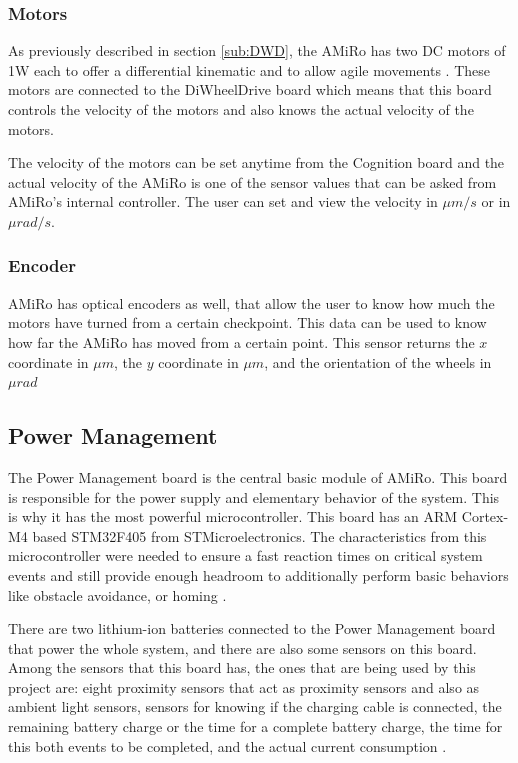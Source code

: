 \documentclass[12pt]{report}%
\begin{document}
\subsubsection{Motors}
As previously described in section \ref{sub:DWD}, the AMiRo has two DC motors of 1W each to offer a differential kinematic and to allow agile movements \cite{AMiRo_paper_modular}. These motors are connected to the DiWheelDrive board which means that this board controls the velocity of the motors and also knows the actual velocity of the motors.

The velocity of the motors can be set anytime from the Cognition board and the actual velocity of the AMiRo is one of the sensor values that can be asked from AMiRo's internal controller. The user can set and view the velocity in $\mu m/s$ or in $\mu rad/s$.

\subsubsection{Encoder}
AMiRo has optical encoders as well, that allow the user to know how much the motors have turned from a certain checkpoint. This data can be used to know how far the AMiRo has moved from a certain point. This sensor returns the $x$ coordinate in $\mu m$, the $y$ coordinate in $\mu m$, and the orientation of the wheels in $\mu rad$

\subsection{Power Management}
\label{PWB}
The Power Management board is the central basic module of AMiRo. This board is responsible for the power supply and elementary behavior of the system. This is why it has the most powerful microcontroller. This board has an ARM Cortex-M4 based STM32F405 from STMicroelectronics. The characteristics from this microcontroller were needed to ensure a fast reaction times on critical system events and still provide enough headroom to additionally perform basic behaviors like obstacle avoidance, or homing \cite{AMiRo_paper_modular}.

There are two lithium-ion batteries connected to the Power Management board that power the whole system, and there are also some sensors on this board. Among the sensors that this board has, the ones that are being used by this project are: eight proximity sensors that act as proximity sensors and also as ambient light sensors, sensors for knowing if the charging cable is connected, the remaining battery charge or the time for a complete battery charge, the time for this both events to be completed, and the actual current consumption  \cite{AMiRo_paper_modular}.
\end{document}
